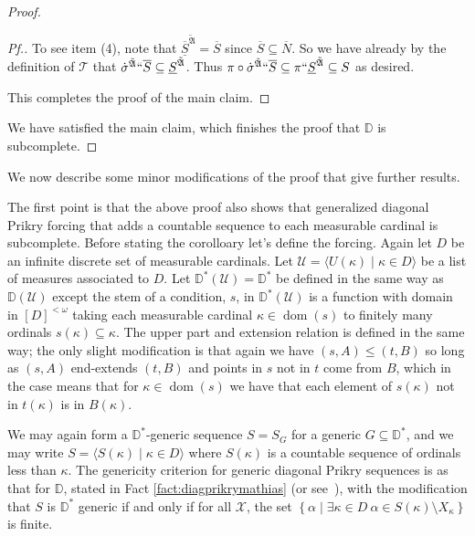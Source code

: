 \documentclass{amsart}
\theoremstyle{definition}
\theoremstyle{remark}
\newcommand{\D}{\mathbb{D}}
\newcommand{\U}{\mathcal{U}}
\DeclareMathOperator{\dom}{dom}
\newcommand{\st}{\; | \;}
\newcommand{\set}[2]{\left\{#1\st #2 \right\}}
\newcommand{\seq}[2]{\langle #1 \st #2 \rangle}
\begin{document}
\begin{proof}
\begin{proof}[Pf.]
To see item (4), note that $\overline{\underline S}^{\tilde{\mathfrak A}} = \overline S$ since $\overline S \subseteq \overline N$. So we have already by the definition of $\mathcal T$  that $\dot{\sigma}^{\tilde{\mathfrak A}}``\overline S \subseteq \underline S^{\tilde{\mathfrak A}}$. Thus $\pi \circ \dot{\sigma}^{\tilde{\mathfrak A}}``\overline S \subseteq \pi `` \underline S^{\tilde{\mathfrak A}} \subseteq S$ as desired. %

This completes the proof of the main claim.
\end{proof}
We have satisfied the main claim, which finishes the proof that $\D$ is subcomplete.
\end{proof}

We now describe some minor modifications of the proof that give further results.

The first point is that the above proof also shows that generalized diagonal Prikry forcing that adds a countable sequence to each measurable cardinal is subcomplete. Before stating the corolloary let's define the forcing. Again let $D$ be an infinite discrete set of measurable cardinals. Let $\U = \seq{ U(\kappa) }{ \kappa \in D }$ be a list of measures associated to $D$. 
Let $\D^*(\U) = \D^*$ be defined in the same way as $\D(\U)$ except the stem of a condition, $s$, in $\D^*(\U)$ is a function with domain in $[D]^{<\omega}$ taking each measurable cardinal $\kappa \in \dom(s)$ to finitely many ordinals $s(\kappa) \subseteq \kappa$. The upper part and extension relation is defined in the same way; the only slight modification is that again we have $(s, A) \leq (t, B)$ so long as $(s, A)$ end-extends $(t, B)$ and points in $s$ not in $t$ come from $B$, which in the case means that for $\kappa \in \dom(s)$ we have that each element of $s(\kappa)$ not in $t(\kappa)$ is in $B(\kappa)$. 

We may again form a $\D^*$-generic sequence $S = S_G$ for a generic $G \subseteq \D^*$, and we may write $S = \seq{ S(\kappa) }{ \kappa \in D }$ where $S(\kappa)$ is a countable sequence of ordinals less than $\kappa$. The genericity criterion for generic diagonal Prikry sequences is as that for $\D$, stated in Fact \ref{fact:diagprikrymathias} (or see~\cite[Theorem 1]{Fuchs:2005kx}), with the modification that $S$ is $\D^*$ generic if and only if for all $\mathcal X$, the set $\set{ \alpha }{ \exists \kappa \in D \ \alpha \in S(\kappa) \setminus X_\kappa }$ is finite.
\end{document}
